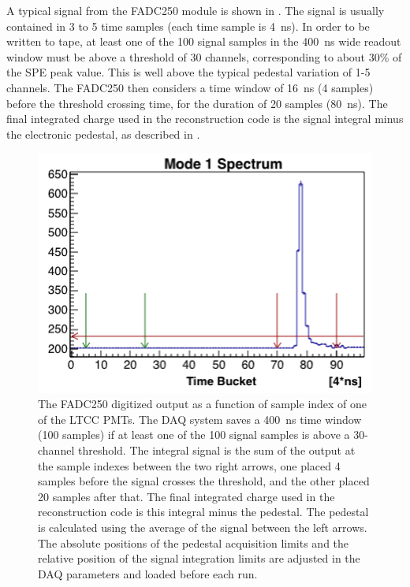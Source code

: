 A typical signal from the FADC250 module is shown in . The signal is usually contained in 3 to 5 time samples
(each time sample is 4~ns). In order to be written to tape, at least one of the 100 signal samples in the 400~ns
wide readout window must be above a threshold of 30 channels, corresponding to about 30\% of the SPE peak value.
This is well above the typical pedestal variation of 1-5 channels. The FADC250 then considers a time window of 16~ns
(4 samples) before the threshold crossing time, for the duration of 20 samples (80~ns). The final integrated charge
used in the reconstruction code is the signal integral minus the electronic pedestal, as described in .

\begin{figure}
	\centering
	\includegraphics[width=0.99\columnwidth,keepaspectratio]{img/fadc.png}
	\caption{The FADC250 digitized output as a function of sample index of one of the LTCC PMTs.
          The DAQ system saves a 400~ns time window (100 samples) if at least one of the 100 signal samples is
          above a 30-channel threshold. The integral signal is the sum of the output at the sample indexes between
          the two right arrows, one placed 4 samples before the signal crosses the threshold, and the other placed
          20 samples after that. The final integrated charge used in the reconstruction code is this integral minus
          the pedestal. The pedestal is calculated using the average of the signal between the left arrows. The
          absolute positions of the pedestal acquisition limits and the relative position of the signal integration
          limits are adjusted in the DAQ parameters and loaded before each run.}
	\label{fig:fadc}
\end{figure}

